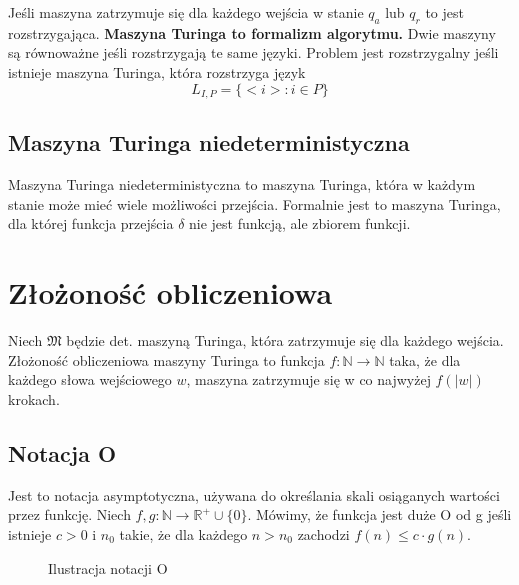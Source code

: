 \documentclass{../notatki}
\begin{document}
Jeśli maszyna zatrzymuje się dla każdego wejścia w stanie $q_a$ lub $q_r$ to
jest rozstrzygająca. \textbf{Maszyna Turinga to formalizm algorytmu.} Dwie
maszyny są równoważne jeśli rozstrzygają te same języki. Problem jest
rozstrzygalny jeśli istnieje maszyna Turinga, która rozstrzyga język
$$
L_{I,P} = \{<i>: i \in P\}
$$

\subsection{Maszyna Turinga niedeterministyczna}

Maszyna Turinga niedeterministyczna to maszyna Turinga, która w każdym stanie
może mieć wiele możliwości przejścia. Formalnie jest to maszyna Turinga, dla
której funkcja przejścia $\delta$ nie jest funkcją, ale zbiorem funkcji.

\section{Złożoność obliczeniowa}

Niech $\mathfrak{M}$ będzie det. maszyną Turinga, która zatrzymuje się dla
każdego wejścia. Złożoność obliczeniowa maszyny Turinga to funkcja
$f: \mathbb{N} \rightarrow \mathbb{N}$ taka, że dla każdego słowa
wejściowego $w$, maszyna zatrzymuje się w co najwyżej $f(|w|)$ krokach.

\subsection{Notacja O}

Jest to notacja asymptotyczna, używana do określania skali osiąganych wartości
przez funkcję. Niech $f, g: \mathbb{N} \rightarrow \mathbb{R}^+ \cup \{0\}$.
Mówimy, że funkcja jest duże O od g jeśli istnieje $c > 0$ i $n_0$ takie, że
dla każdego $n > n_0$ zachodzi $f(n) \le c \cdot g(n)$.

\begin{figure*}[h]
  \centering
  \caption{Ilustracja notacji O}
\end{figure*}
\end{document}
